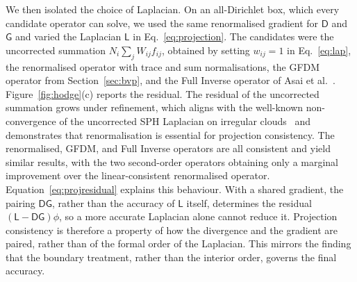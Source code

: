 \documentclass[preprint,review,12pt]{elsarticle}
\begin{document}
We then isolated the choice of Laplacian.
On an all-Dirichlet box, which every candidate operator can solve, we used the same renormalised gradient for $\mathsf D$ and $\mathsf G$ and varied the Laplacian $\mathsf L$ in Eq.~\eqref{eq:projection}.
The candidates were the uncorrected summation $N_i\sum_j W_{ij}f_{ij}$, obtained by setting $w_{ij}=1$ in Eq.~\eqref{eq:lap}, the renormalised operator with trace and sum normalisations, the GFDM operator from Section~\ref{sec:bvp}, and the Full Inverse operator of Asai et al.~\cite{Asai2023}.
Figure~\ref{fig:hodge}(c) reports the residual.
The residual of the uncorrected summation grows under refinement, which aligns with the well-known non-convergence of the uncorrected SPH Laplacian on irregular clouds~\cite{Brookshaw1985,Fatehi2011,Basic2018} and demonstrates that renormalisation is essential for projection consistency.
The renormalised, GFDM, and Full Inverse operators are all consistent and yield similar results, with the two second-order operators obtaining only a marginal improvement over the linear-consistent renormalised operator.
Equation~\eqref{eq:projresidual} explains this behaviour.
With a shared gradient, the pairing $\mathsf D\mathsf G$, rather than the accuracy of $\mathsf L$ itself, determines the residual $(\mathsf L-\mathsf D\mathsf G)\phi$, so a more accurate Laplacian alone cannot reduce it.
Projection consistency is therefore a property of how the divergence and the gradient are paired, rather than of the formal order of the Laplacian.
This mirrors the finding that the boundary treatment, rather than the interior order, governs the final accuracy.
\end{document}
